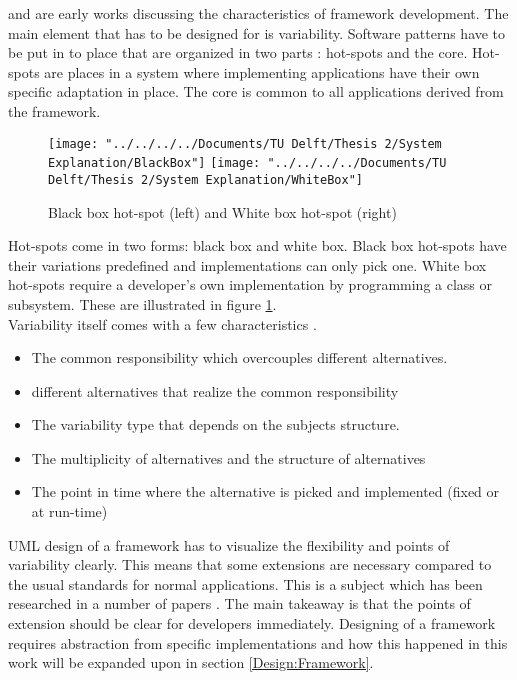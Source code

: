 \cite{schmid1997systematic} and \cite{roberts1996evolving} are early works discussing the characteristics of framework development. The main element that has to be designed for is variability. Software patterns have to be put in to place that are organized in two parts \citep{ben2004uml}: hot-spots and the core. Hot-spots are places in a system where implementing applications have their own specific adaptation in place. The core is common to all applications derived from the framework. \\

\begin{figure}
	\centering
	\texttt{[image: "../../../../Documents/TU Delft/Thesis 2/System Explanation/BlackBox"]}
	\texttt{[image: "../../../../Documents/TU Delft/Thesis 2/System Explanation/WhiteBox"]}	\caption[Black White Box Hot Spot]{Black box hot-spot (left) and White box hot-spot (right)}
	\label{fig:blackbox}
\end{figure}

Hot-spots come in two forms: black box and white box. Black box hot-spots have their variations predefined and implementations can only pick one. White box hot-spots require a developer's own implementation by programming a class or subsystem. These are illustrated in figure \ref{fig:blackbox}.\\

Variability itself comes with a few characteristics \citep{schmid1997systematic}. 
\begin{itemize}
	\item The common responsibility which overcouples different alternatives.
	\item different alternatives that realize the common responsibility
	\item The variability type that depends on the subjects structure.
	\item The multiplicity of alternatives and the structure of alternatives
	\item The point in time where the alternative is picked and implemented (fixed or at run-time)
\end{itemize}

UML design of a framework has to visualize the flexibility and points of variability clearly. This means that some extensions are necessary compared to the usual standards for normal applications. This is a subject which has been researched in a number of papers \citep{bouassida2001uml} \citep{ben2004uml}. The main takeaway is that the points of extension should be clear for developers immediately. Designing of a framework requires abstraction from specific implementations and how this happened in this work will be expanded upon in section \ref{Design:Framework}. \\

